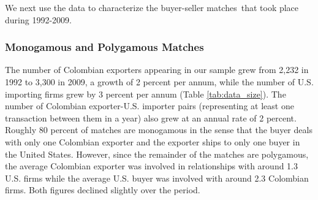 \documentclass[12pt,titlepage]{article}
\begin{document}
We next use the data to characterize the buyer-seller matches\ that took
place during 1992-2009.

\subsubsection{Monogamous and Polygamous Matches}

The number of Colombian exporters appearing in our sample grew from 2,232 in
1992 to 3,300 in 2009, a growth of 2 percent per annum, while the number of
U.S. importing firms grew by 3 percent per annum (Table \ref{tab:data_size}). The number of Colombian
exporter-U.S. importer pairs (representing at least one transaction between
them in a year) also grew at an annual rate of 2 percent. Roughly 80 percent
of matches are monogamous in the sense that the buyer deals with only one
Colombian exporter and the exporter ships to only one buyer in the United
States. However, since the remainder of the matches are polygamous, the
average Colombian exporter was involved in relationships with around 1.3
U.S. firms while the average U.S. buyer was involved with around 2.3
Colombian firms. Both figures declined slightly over the period.
\end{document}
